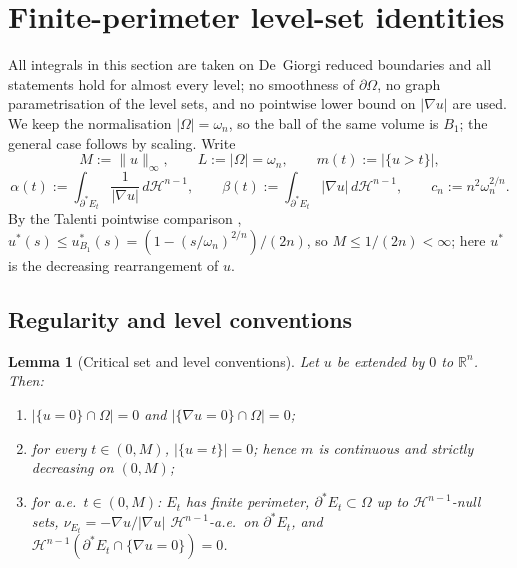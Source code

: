 \documentclass[11pt]{amsart}
\newtheorem{lemma}[theorem]{Lemma}
\theoremstyle{definition}
\newcommand{\R}{\mathbb R}
\newcommand{\Om}{\Omega}
\newcommand{\Hn}{\mathcal H^{n-1}}
\begin{document}
\section{Finite-perimeter level-set identities}\label{sec:identity}

All integrals in this section are taken on De~Giorgi reduced boundaries and all
statements hold for almost every level; no smoothness of \(\partial\Om\), no
graph parametrisation of the level sets, and no pointwise lower bound on
\(|\nabla u|\) are used.  We keep the normalisation \(|\Om|=\omega_n\), so the
ball of the same volume is \(B_1\); the general case follows by scaling.  Write
\[
   M:=\|u\|_\infty,\qquad L:=|\Om|=\omega_n,\qquad
   m(t):=|\{u>t\}|,
\]
\[
   \alpha(t):=\int_{\partial^*E_t}\frac1{|\nabla u|}\,d\Hn,\qquad
   \beta(t):=\int_{\partial^*E_t}|\nabla u|\,d\Hn,\qquad
   c_n:=n^2\omega_n^{2/n}.
\]
By the Talenti pointwise comparison \cite{Talenti1976},
\(u^*(s)\le u_{B_1}^*(s)=(1-(s/\omega_n)^{2/n})/(2n)\), so
\(M\le 1/(2n)<\infty\); here \(u^*\) is the decreasing rearrangement of \(u\).

\subsection*{Regularity and level conventions}

\begin{lemma}[Critical set and level conventions]\label{lem:id-noatoms}
Let \(u\) be extended by \(0\) to \(\R^n\).  Then:
\begin{enumerate}[label=\textup{(\alph*)},leftmargin=2.2em]
\item \(|\{u=0\}\cap\Om|=0\) and \(|\{\nabla u=0\}\cap\Om|=0\);
\item for every \(t\in(0,M)\), \(|\{u=t\}|=0\); hence \(m\) is continuous and
strictly decreasing on \((0,M)\);
\item for a.e.\ \(t\in(0,M)\): \(E_t\) has finite perimeter,
\(\partial^*E_t\subset\Om\) up to \(\Hn\)-null sets,
\(\nu_{E_t}=-\nabla u/|\nabla u|\) \(\Hn\)-a.e.\ on \(\partial^*E_t\), and
\(\Hn(\partial^*E_t\cap\{\nabla u=0\})=0\).
\end{enumerate}
\end{lemma}
\end{document}
